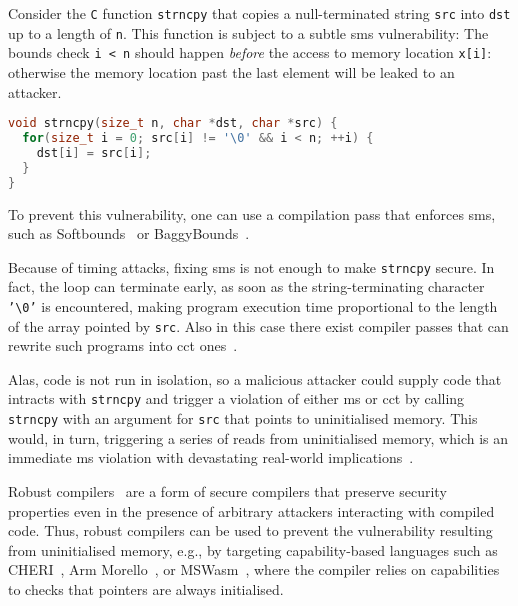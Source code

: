 \documentclass[utf8,acmsmall,review,screen,dvipsnames,anonymous]{acmart}
\begin{document}
\begin{example}[strncpy]\label{ex:strncpy}
Consider the \texttt{C} function \texttt{strncpy} that copies a null-terminated string \texttt{src} into \texttt{dst} up to a length of \texttt{n}.
This function is subject to a subtle \gls*{sms} vulnerability: The bounds check \texttt{i < n} should happen {\it before} the access to memory location \texttt{x[i]}: otherwise
the memory location past the last element will be leaked to an attacker.
\begin{lstlisting}[language=c,basicstyle=\small\ttfamily,morekeywords={size_t}]
void strncpy(size_t n, char *dst, char *src) {
  for(size_t i = 0; src[i] != '\0' && i < n; ++i) {
    dst[i] = src[i];
  }
}
\end{lstlisting}

To prevent this vulnerability, one can use a compilation pass that enforces \gls*{sms}, such as Softbounds~\cite{nagarakatte2009soft} or BaggyBounds~\cite{akritidis2009baggy}.

Because of timing attacks, fixing \gls*{sms} is not enough to make \texttt{strncpy} secure.
In fact, the loop can terminate early, as soon as the string-terminating character \texttt{'\textbackslash 0'} is encountered, making program execution time proportional to the length of the array pointed by \texttt{src}.
Also in this case there exist compiler passes that can rewrite such programs into \gls*{cct} ones~\cite{cauligi2019fact}.

Alas, code is not run in isolation, so a malicious attacker could supply code that intracts with \texttt{strncpy} and trigger a violation of either \gls*{ms} or \gls*{cct} by calling \texttt{strncpy} with an argument for \texttt{src} that points to uninitialised memory.
This would, in turn, triggering a series of reads from uninitialised memory, which is an immediate \gls*{ms} violation with devastating real-world implications~\cite{uninit-0,uninit-1,uninit-2,uninit-3,uninit-4}.

Robust compilers~\cite{abate2019jour} are a form of secure compilers that preserve security properties even in the presence of arbitrary attackers interacting with compiled code.
Thus, robust compilers can be used to prevent the vulnerability resulting from uninitialised memory, e.g., by targeting capability-based languages such as CHERI~\cite{woodruff2014CHERI}, Arm Morello~\cite{arm-morello}, or MSWasm~\cite{michael2023mswasm}, where the compiler relies on capabilities to checks that pointers are always initialised.
\end{example}
\end{document}
